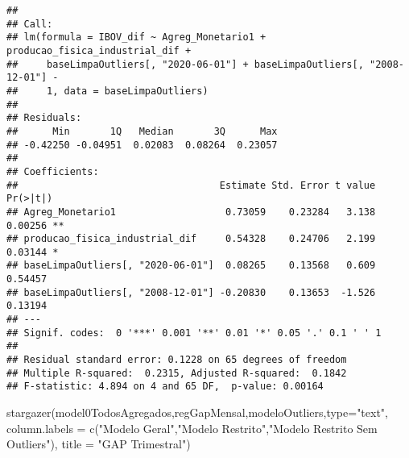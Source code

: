 \documentclass[
]{article}
\newenvironment{Shaded}{\begin{snugshade}}{\end{snugshade}}
\newcommand{\AttributeTok}[1]{\textcolor[rgb]{0.77,0.63,0.00}{#1}}
\newcommand{\FunctionTok}[1]{\textcolor[rgb]{0.00,0.00,0.00}{#1}}
\newcommand{\NormalTok}[1]{#1}
\newcommand{\StringTok}[1]{\textcolor[rgb]{0.31,0.60,0.02}{#1}}
\begin{document}
\begin{verbatim}
## 
## Call:
## lm(formula = IBOV_dif ~ Agreg_Monetario1 + producao_fisica_industrial_dif + 
##     baseLimpaOutliers[, "2020-06-01"] + baseLimpaOutliers[, "2008-12-01"] - 
##     1, data = baseLimpaOutliers)
## 
## Residuals:
##      Min       1Q   Median       3Q      Max 
## -0.42250 -0.04951  0.02083  0.08264  0.23057 
## 
## Coefficients:
##                                   Estimate Std. Error t value Pr(>|t|)   
## Agreg_Monetario1                   0.73059    0.23284   3.138  0.00256 **
## producao_fisica_industrial_dif     0.54328    0.24706   2.199  0.03144 * 
## baseLimpaOutliers[, "2020-06-01"]  0.08265    0.13568   0.609  0.54457   
## baseLimpaOutliers[, "2008-12-01"] -0.20830    0.13653  -1.526  0.13194   
## ---
## Signif. codes:  0 '***' 0.001 '**' 0.01 '*' 0.05 '.' 0.1 ' ' 1
## 
## Residual standard error: 0.1228 on 65 degrees of freedom
## Multiple R-squared:  0.2315, Adjusted R-squared:  0.1842 
## F-statistic: 4.894 on 4 and 65 DF,  p-value: 0.00164
\end{verbatim}

\begin{Shaded}
\begin{Highlighting}[]
\FunctionTok{stargazer}\NormalTok{(model0TodosAgregados,regGapMensal,modeloOutliers,}\AttributeTok{type=}\StringTok{"text"}\NormalTok{,}
          \AttributeTok{column.labels =} \FunctionTok{c}\NormalTok{(}\StringTok{"Modelo Geral"}\NormalTok{,}\StringTok{"Modelo Restrito"}\NormalTok{,}\StringTok{"Modelo Restrito Sem Outliers"}\NormalTok{),}
          \AttributeTok{title =} \StringTok{"GAP Trimestral"}\NormalTok{)}
\end{Highlighting}
\end{Shaded}
\end{document}
